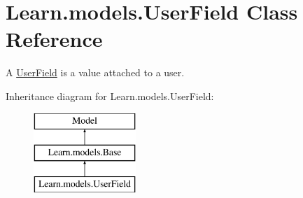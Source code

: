 \hypertarget{class_learn_1_1models_1_1_user_field}{\section{Learn.\-models.\-User\-Field Class Reference}
\label{class_learn_1_1models_1_1_user_field}
}


A \hyperlink{class_learn_1_1models_1_1_user_field}{User\-Field} is a value attached to a user.  


Inheritance diagram for Learn.\-models.\-User\-Field\-:\begin{figure}[H]
\begin{center}
\leavevmode
\includegraphics[height=3.000000cm]{class_learn_1_1models_1_1_user_field}
\end{center}
\end{figure}

